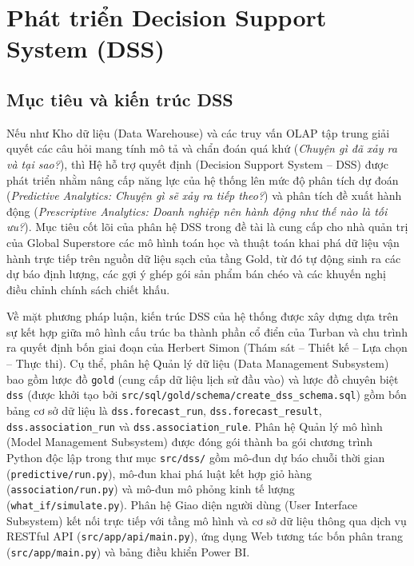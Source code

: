 \section{Phát triển Decision Support System (DSS)}

\subsection{Mục tiêu và kiến trúc DSS}

Nếu như Kho dữ liệu (Data Warehouse) và các truy vấn OLAP tập trung giải quyết các câu hỏi mang tính mô tả và chẩn đoán quá khứ (\textit{Chuyện gì đã xảy ra và tại sao?}), thì Hệ hỗ trợ quyết định (Decision Support System -- DSS) được phát triển nhằm nâng cấp năng lực của hệ thống lên mức độ phân tích dự đoán (\textit{Predictive Analytics: Chuyện gì sẽ xảy ra tiếp theo?}) và phân tích đề xuất hành động (\textit{Prescriptive Analytics: Doanh nghiệp nên hành động như thế nào là tối ưu?}). Mục tiêu cốt lõi của phân hệ DSS trong đề tài là cung cấp cho nhà quản trị của Global Superstore các mô hình toán học và thuật toán khai phá dữ liệu vận hành trực tiếp trên nguồn dữ liệu sạch của tầng Gold, từ đó tự động sinh ra các dự báo định lượng, các gợi ý ghép gói sản phẩm bán chéo và các khuyến nghị điều chỉnh chính sách chiết khấu.

Về mặt phương pháp luận, kiến trúc DSS của hệ thống được xây dựng dựa trên sự kết hợp giữa mô hình cấu trúc ba thành phần cổ điển của Turban \cite{turban2014} và chu trình ra quyết định bốn giai đoạn của Herbert Simon \cite{simon1960} (Thám sát -- Thiết kế -- Lựa chọn -- Thực thi). Cụ thể, phân hệ Quản lý dữ liệu (Data Management Subsystem) bao gồm lược đồ \texttt{gold} (cung cấp dữ liệu lịch sử đầu vào) và lược đồ chuyên biệt \texttt{dss} (được khởi tạo bởi \texttt{src/sql/gold/schema/create\_dss\_schema.sql}) gồm bốn bảng cơ sở dữ liệu là \texttt{dss.forecast\_run}, \texttt{dss.forecast\_result}, \texttt{dss.association\_run} và \texttt{dss.association\_rule}. Phân hệ Quản lý mô hình (Model Management Subsystem) được đóng gói thành ba gói chương trình Python độc lập trong thư mục \texttt{src/dss/} gồm mô-đun dự báo chuỗi thời gian (\texttt{predictive/run.py}), mô-đun khai phá luật kết hợp giỏ hàng (\texttt{association/run.py}) và mô-đun mô phỏng kinh tế lượng (\texttt{what\_if/simulate.py}). Phân hệ Giao diện người dùng (User Interface Subsystem) kết nối trực tiếp với tầng mô hình và cơ sở dữ liệu thông qua dịch vụ RESTful API (\texttt{src/app/api/main.py}), ứng dụng Web tương tác bốn phân trang (\texttt{src/app/main.py}) và bảng điều khiển Power BI.

